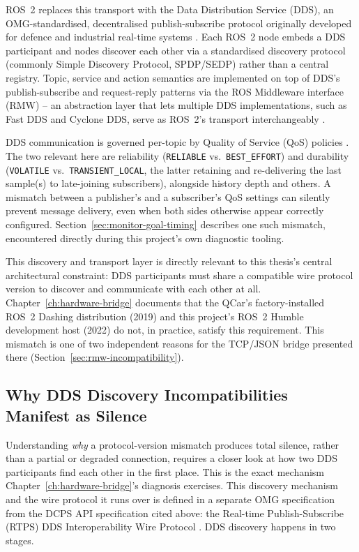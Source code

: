 ROS~2 replaces this transport with the Data Distribution Service
(DDS), an OMG-standardised, decentralised publish-subscribe protocol
originally developed for defence and industrial real-time systems
\cite{omg2015dds}. Each ROS~2 node embeds a DDS participant and
nodes discover each other via a standardised discovery protocol
(commonly Simple Discovery Protocol, SPDP/SEDP) rather than a
central registry. Topic, service and action semantics are
implemented on top of DDS's publish-subscribe and request-reply
patterns via the ROS Middleware interface (RMW) -- an abstraction
layer that lets multiple DDS implementations, such as Fast DDS and
Cyclone DDS, serve as ROS~2's transport interchangeably
\cite{macenski2022ros2}.

DDS communication is governed per-topic by Quality of Service (QoS)
policies \cite{omg2015dds}. The two relevant here are reliability
(\texttt{RELIABLE} vs.\ \texttt{BEST\_EFFORT}) and durability
(\texttt{VOLATILE} vs.\ \texttt{TRANSIENT\_LOCAL}, the latter
retaining and re-delivering the last sample(s) to late-joining
subscribers), alongside history depth and others. A mismatch between
a publisher's and a subscriber's QoS settings can silently prevent
message delivery, even when both sides otherwise appear correctly
configured. Section~\ref{sec:monitor-goal-timing} describes one such
mismatch, encountered directly during this project's own diagnostic
tooling.

This discovery and transport layer is directly relevant to this
thesis's central architectural constraint: DDS participants must
share a compatible wire protocol version to discover and communicate
with each other at all. Chapter~\ref{ch:hardware-bridge} documents
that the QCar's factory-installed ROS~2 Dashing distribution (2019)
and this project's ROS~2 Humble development host (2022) do not, in
practice, satisfy this requirement. This mismatch is one of two
independent reasons for the TCP/JSON bridge presented there
(Section~\ref{sec:rmw-incompatibility}).

\subsection{Why DDS Discovery Incompatibilities Manifest as Silence}
\label{sec:dds-discovery-mechanism}

Understanding \emph{why} a protocol-version mismatch produces total
silence, rather than a partial or degraded connection, requires a
closer look at how two DDS participants find each other in the first
place. This is the exact mechanism Chapter~\ref{ch:hardware-bridge}'s
diagnosis exercises. This discovery mechanism and the wire protocol
it runs over is defined in a separate OMG specification from the
DCPS API specification cited above: the Real-time Publish-Subscribe
(RTPS) DDS Interoperability Wire Protocol \cite{omg2014rtps}. DDS
discovery happens in two stages.

